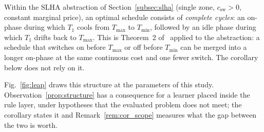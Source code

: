 \documentclass[3p,twocolumn,number]{elsarticle}
\newcommand{\Tmin}{T_{\min}}
\newcommand{\Tmax}{T_{\max}}
\newcommand{\csw}{c_{\mathrm{sw}}}
\begin{document}
\begin{observation}
\label{prop:structure}
Within the SLHA abstraction of Section~\ref{subsec:slha} (single zone, $\csw>0$, constant marginal price), an optimal schedule consists of \emph{complete cycles}: an on-phase during which $T_1$ cools from $\Tmax$ to $\Tmin$, followed by an idle phase during which $T_1$ drifts back to $\Tmax$. This is Theorem~2 of~\cite{Mousa2016} applied to the abstraction: a schedule that switches on before $\Tmax$ or off before $\Tmin$ can be merged into a longer on-phase at the same continuous cost and one fewer switch. The corollary below does not rely on it.
\end{observation}



Fig.~\ref{fig:leap} draws this structure at the parameters of this study. Observation~\ref{prop:structure} has a consequence for a learner placed inside the rule layer, under hypotheses that the evaluated problem does not meet; the corollary states it and Remark~\ref{rem:cor_scope} measures what the gap between the two is worth.
\end{document}
